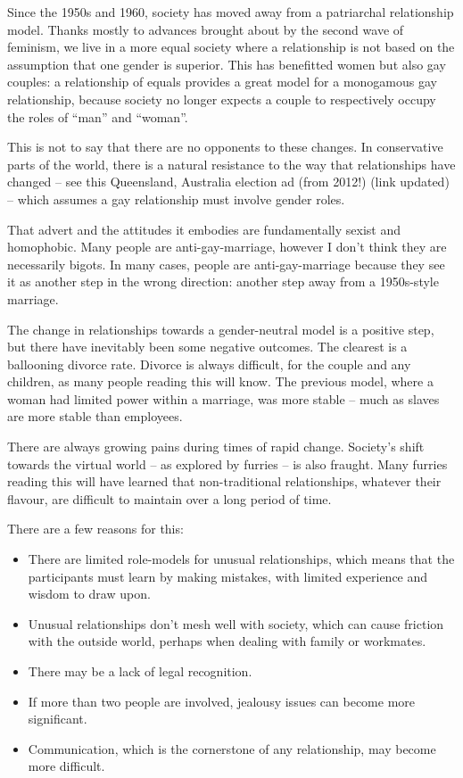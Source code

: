 Since the 1950s and 1960, society has moved away from a patriarchal relationship model. Thanks mostly to advances brought about by the second wave of feminism, we live in a more equal society where a relationship is not based on the assumption that one gender is superior. This has benefitted women but also gay couples: a relationship of equals provides a great model for a monogamous gay relationship, because society no longer expects a couple to respectively occupy the roles of ``man'' and ``woman''.

This is not to say that there are no opponents to these changes. In conservative parts of the world, there is a natural resistance to the way that relationships have changed -- see this Queensland, Australia election ad (from 2012!) (link updated) -- which assumes a gay relationship must involve gender roles.

That advert and the attitudes it embodies are fundamentally sexist and homophobic. Many people are anti-gay-marriage, however I don't think they are necessarily bigots. In many cases, people are anti-gay-marriage because they see it as another step in the wrong direction: another step away from a 1950s-style marriage.

The change in relationships towards a gender-neutral model is a positive step, but there have inevitably been some negative outcomes. The clearest is a ballooning divorce rate. Divorce is always difficult, for the couple and any children, as many people reading this will know. The previous model, where a woman had limited power within a marriage, was more stable -- much as slaves are more stable than employees.

There are always growing pains during times of rapid change. Society's shift towards the virtual world -- as explored by furries -- is also fraught. Many furries reading this will have learned that non-traditional relationships, whatever their flavour, are difficult to maintain over a long period of time.

There are a few reasons for this:

\begin{itemize}
  \item There are limited role-models for unusual relationships, which means that the participants must learn by making mistakes, with limited experience and wisdom to draw upon.
  \item Unusual relationships don't mesh well with society, which can cause friction with the outside world, perhaps when dealing with family or workmates.
  \item There may be a lack of legal recognition.
  \item If more than two people are involved, jealousy issues can become more significant.
  \item Communication, which is the cornerstone of any relationship, may become more difficult.
\end{itemize}

